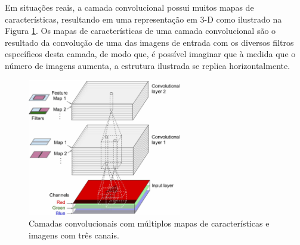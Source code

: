 Em situações reais, a camada convolucional possui muitos mapas de características, resultando
em uma representação em 3-D como ilustrado na Figura \ref{fig:featmaps}. Os mapas de características
de uma camada convolucional são o resultado da convolução de uma das imagens de entrada com os diversos
filtros específicos desta camada, de modo que, é possível imaginar que à medida que o número de imagens aumenta,
a estrutura ilustrada se replica horizontalmente.
\begin{figure}[htp]
\begin{center}
  \includegraphics[width=0.6\textwidth]{fig/feat_maps}
  \caption{Camadas convolucionais com múltiplos mapas de características e imagens com três canais. \citep{aurelien17}}
  \label{fig:featmaps}
\end{center}
\end{figure}

